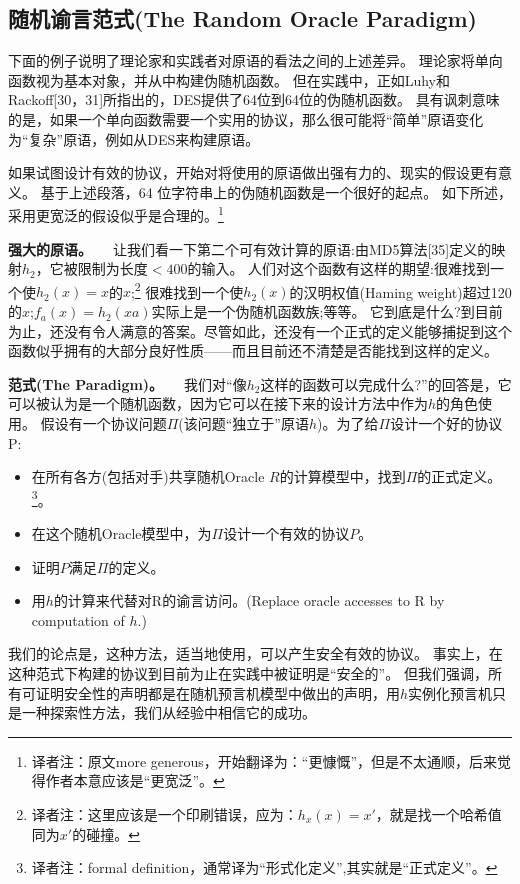 \documentclass[]{article}
\begin{document}
	\subsection{随机谕言范式(The Random Oracle Paradigm)}
	
	下面的例子说明了理论家和实践者对原语的看法之间的上述差异。
	理论家将单向函数视为基本对象，并从中构建伪随机函数。
	但在实践中，正如Luhy和Rackoff[30，31]所指出的，DES提供了64位到64位的伪随机函数。
	具有讽刺意味的是，如果一个单向函数需要一个实用的协议，那么很可能将“简单”原语变化为“复杂”原语，例如从DES来构建原语。
	
	
	如果试图设计有效的协议，开始对将使用的原语做出强有力的、现实的假设更有意义。
	基于上述段落，64 位字符串上的伪随机函数是一个很好的起点。
	如下所述，采用更宽泛的假设似乎是合理的。\footnote{译者注：原文more generous，开始翻译为：“更慷慨”，但是不太通顺，后来觉得作者本意应该是“更宽泛”。}
	
	
	\textbf{强大的原语。}\ \ \  
	让我们看一下第二个可有效计算的原语:由MD5算法[35]定义的映射$h_2$，它被限制为长度$<400$的输入。
	人们对这个函数有这样的期望:很难找到一个使$h_2(x) = x$的$x$;\footnote{译者注：这里应该是一个印刷错误，应为：$h_x(x)=x'$，就是找一个哈希值同为$x'$的碰撞。}
	很难找到一个使$h_2(x)$的汉明权值(Haming weight)超过120的$x$;$f_a(x) = h_2(xa)$实际上是一个伪随机函数族;等等。
	它到底是什么?到目前为止，还没有令人满意的答案。尽管如此，还没有一个正式的定义能够捕捉到这个函数似乎拥有的大部分良好性质——而且目前还不清楚是否能找到这样的定义。
	
	
	\textbf{范式(The Paradigm)。}\ \ \ 
	我们对“像$h_2$这样的函数可以完成什么?”的回答是，它可以被认为是一个随机函数，因为它可以在接下来的设计方法中作为$h$的角色使用。
	假设有一个协议问题$\Pi$(该问题“独立于”原语$h$)。为了给$\Pi$设计一个好的协议P:
	\begin{itemize}
		\item 在所有各方(包括对手)共享随机Oracle $R$的计算模型中，找到$\Pi$的正式定义。\footnote{译者注：formal definition，通常译为“形式化定义”,其实就是“正式定义”。}。
		\item 在这个随机Oracle模型中，为$\Pi$设计一个有效的协议$P$。
		\item 证明$P$满足$\Pi$的定义。
		\item 用$h$的计算来代替对R的谕言访问。(Replace oracle accesses to R by computation of $h$.)
	\end{itemize}
	
	我们的论点是，这种方法，适当地使用，可以产生安全有效的协议。
	事实上，在这种范式下构建的协议到目前为止在实践中被证明是“安全的”。
	但我们强调，所有可证明安全性的声明都是在随机预言机模型中做出的声明，用$h$实例化预言机只是一种探索性方法，我们从经验中相信它的成功。
	
\end{document}
